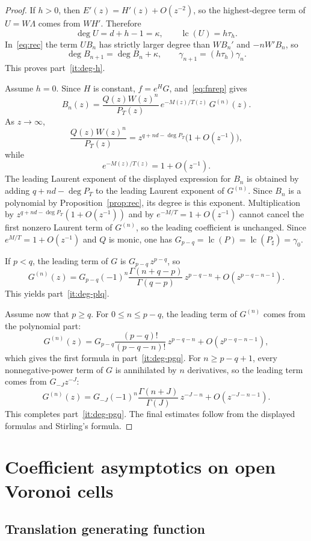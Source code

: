 \documentclass[reqno]{article}
\theoremstyle{definition}
\theoremstyle{remark}
\theoremstyle{plain}
\newcommand{\lc}{\operatorname{lc}}
\begin{document}
\begin{proof}
If $h>0$, then $E'(z)=H'(z)+O(z^{-2})$, so the highest-degree term of $U=W\Lambda$ comes from $WH'$. Therefore
$$\deg U=d+h-1=\kappa,\qquad\lc(U)=h\tau_h.$$
In~\eqref{eq:rec} the term $UB_n$ has strictly larger degree than $WB_n'$ and $-nW'B_n$, so
$$\deg B_{n+1}=\deg B_n+\kappa,\qquad\gamma_{n+1}=(h\tau_h)\gamma_n.$$
This proves part~\ref{it:deg-h}.

Assume $h=0$. Since $H$ is constant, $f=e^H G$, and~\eqref{eq:fnrep} gives
$$B_n(z)=\frac{Q(z)W(z)^n}{P_T(z)}\,e^{-M(z)/T(z)}\,G^{(n)}(z).$$
As $z\to\infty$,
$$\frac{Q(z)W(z)^n}{P_T(z)}=z^{q+nd-\deg P_T}\bigl(1+O(z^{-1})\bigr),$$
while
$$e^{-M(z)/T(z)}=1+O(z^{-1}).$$
The leading Laurent exponent of the displayed expression for $B_n$ is obtained by adding $q+nd-\deg P_T$ to the leading Laurent exponent of $G^{(n)}$. Since $B_n$ is a polynomial by Proposition~\ref{prop:rec}, its degree is this exponent. Multiplication by $z^{q+nd-\deg P_T}(1+O(z^{-1}))$ and by $e^{-M/T}=1+O(z^{-1})$ cannot cancel the first nonzero Laurent term of $G^{(n)}$, so the leading coefficient is unchanged. Since $e^{M/T}=1+O(z^{-1})$ and $Q$ is monic, one has $G_{p-q}=\lc(P)=\lc(P_\sharp)=\gamma_0$.

If $p<q$, the leading term of $G$ is $G_{p-q}\, z^{p-q}$, so
$$G^{(n)}(z)=G_{p-q}(-1)^n\frac{\Gamma(n+q-p)}{\Gamma(q-p)}\,z^{p-q-n}+O(z^{p-q-n-1}).$$
This yields part~\ref{it:deg-plq}.

Assume now that $p\ge q$. For $0\le n\le p-q$, the leading term of $G^{(n)}$ comes from the polynomial part:
$$G^{(n)}(z)=G_{p-q}\frac{(p-q)!}{(p-q-n)!}\,z^{p-q-n}+O(z^{p-q-n-1}),$$
which gives the first formula in part~\ref{it:deg-pgq}. For $n\ge p-q+1$, every nonnegative-power term of $G$ is annihilated by $n$ derivatives, so the leading term comes from $G_{-J}z^{-J}$:
$$G^{(n)}(z)=G_{-J}(-1)^n\frac{\Gamma(n+J)}{\Gamma(J)}\,z^{-J-n}+O(z^{-J-n-1}).$$
This completes part~\ref{it:deg-pgq}. The final estimates follow from the displayed formulas and Stirling's formula.
\end{proof}

\section{Coefficient asymptotics on open Voronoi cells}\label{sec:coef}

\subsection{Translation generating function}
\end{document}
